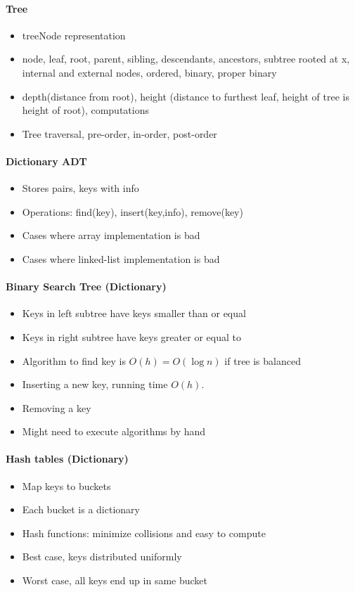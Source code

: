 \documentclass[12 pt]{article}
\theoremstyle{definition}
\begin{document}
  \paragraph{Tree}
  \begin{itemize}
  \item treeNode representation
  \item node, leaf, root, parent, sibling, descendants, ancestors, subtree rooted at x, internal and external nodes, ordered, binary, proper binary
  \item depth(distance from root), height (distance to furthest leaf, height of tree is height of root), computations
  \item Tree traversal, pre-order, in-order, post-order
  \end{itemize}
  \paragraph{Dictionary ADT}
  \begin{itemize}
  \item Stores pairs, keys with info
  \item Operations: find(key), insert(key,info), remove(key)
  \item Cases where array implementation is bad
  \item Cases where linked-list implementation is bad
  \end{itemize}
  \paragraph{Binary Search Tree (Dictionary)}
  \begin{itemize}
  \item Keys in left subtree have keys smaller than or equal
  \item Keys in right subtree have keys greater or equal to
  \item Algorithm to find key is $O(h)=O(\log n)$ if tree is balanced
  \item Inserting a new key, running time $O(h)$.
  \item Removing a key
  \item Might need to execute algorithms by hand
  \end{itemize}
  \paragraph{Hash tables (Dictionary)}
  \begin{itemize}
  \item Map keys to buckets
  \item Each bucket is a dictionary
  \item Hash functions: minimize collisions and easy to compute
  \item Best case, keys distributed uniformly
  \item Worst case, all keys end up in same bucket
  \end{itemize}
\end{document}
